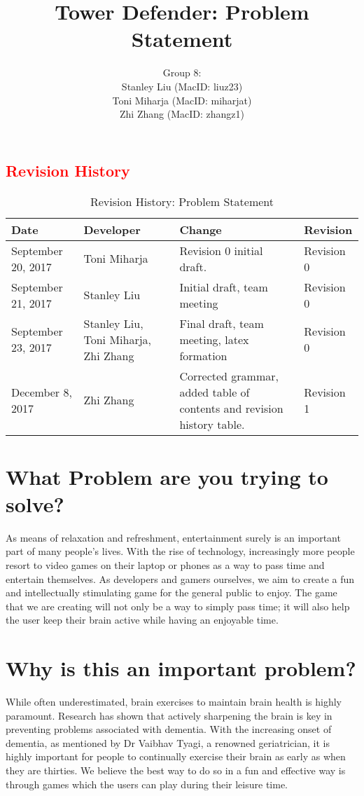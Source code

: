 \documentclass[12pt]{article}
\title{Tower Defender: Problem Statement}
\author{Group 8: \\
                 Stanley Liu (MacID: liuz23) \\    
                 Toni Miharja (MacID: miharjat)\\
                 Zhi Zhang (MacID: zhangz1)}
\begin{document}
\maketitle
\newpage
\textcolor{red}{\tableofcontents}
\newpage

\textcolor{red}{\section{Revision History}}
\begin{table}[h!]
    \centering
    \textcolor{red}{
    \begin{tabular}{|p{2.5cm}|p{3cm}|p{3cm}|p{2cm}|}
    \hline
    \textbf {Date}  & {Developer} & {Change} & {Revision} \\
    \hline
    September 20, 2017 & Toni Miharja & Revision 0 initial draft. & Revision 0\\
    \hline
    September 21, 2017  & Stanley Liu & Initial draft, team meeting & Revision 0\\
    \hline
    September 23, 2017  & Stanley Liu, Toni Miharja, Zhi Zhang & Final draft, team meeting, latex formation & Revision 0 \\
    \hline
    December 8, 2017  & Zhi Zhang & Corrected grammar, added table of contents and revision history table. & Revision 1 \\
    \hline
    \end{tabular}}
    \textcolor{red}{\caption{Revision History: Problem Statement}}
\end{table}

\newpage

\section {What Problem are you trying to solve?}
As means of relaxation and refreshment, entertainment surely is an important part of many people’s lives. With the rise of technology, increasingly more people resort to video games on their laptop or phones as a way to pass time and entertain themselves. As developers and gamers ourselves, we aim to create a fun and intellectually stimulating game for the general public to enjoy. The game that we are creating will not only be a way to simply pass time; it will also help the user keep their brain active while having an enjoyable time. 

\section {Why is this an important problem?}
While often underestimated, brain exercises to maintain brain health is highly paramount. Research has shown that actively sharpening the brain is key in preventing problems associated with dementia. With the increasing onset of dementia, as mentioned by Dr Vaibhav Tyagi, a renowned geriatrician, it is highly important for people to continually exercise their brain as early as when they are thirties. We believe the best way to do so in a fun and effective way is through games which the users can play during their leisure time.
\end{document}
